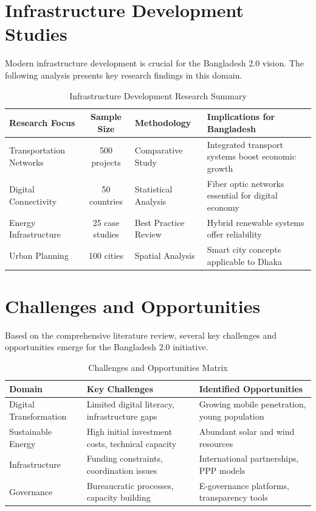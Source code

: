\section{Infrastructure Development Studies}

Modern infrastructure development is crucial for the Bangladesh 2.0 vision. The following analysis presents key research findings in this domain.

\begin{table}[h!]
\centering
\caption{Infrastructure Development Research Summary}
\label{tab:infrastructure}
\begin{tabularx}{\textwidth}{|X|c|X|X|}
\hline
\textbf{Research Focus} & \textbf{Sample Size} & \textbf{Methodology} & \textbf{Implications for Bangladesh} \\
\hline
Transportation Networks & 500 projects & Comparative Study & Integrated transport systems boost economic growth \\
\hline
Digital Connectivity & 50 countries & Statistical Analysis & Fiber optic networks essential for digital economy \\
\hline
Energy Infrastructure & 25 case studies & Best Practice Review & Hybrid renewable systems offer reliability \\
\hline
Urban Planning & 100 cities & Spatial Analysis & Smart city concepts applicable to Dhaka \\
\hline
\end{tabularx}
\end{table}

\section{Challenges and Opportunities}

Based on the comprehensive literature review, several key challenges and opportunities emerge for the Bangladesh 2.0 initiative.

\begin{table}[h!]
\centering
\caption{Challenges and Opportunities Matrix}
\label{tab:challenges_opportunities}
\begin{tabular}{lp{5cm}p{5cm}}
\toprule
\textbf{Domain} & \textbf{Key Challenges} & \textbf{Identified Opportunities} \\
\midrule
Digital Transformation & Limited digital literacy, infrastructure gaps & Growing mobile penetration, young population \\
Sustainable Energy & High initial investment costs, technical capacity & Abundant solar and wind resources \\
Infrastructure & Funding constraints, coordination issues & International partnerships, PPP models \\
Governance & Bureaucratic processes, capacity building & E-governance platforms, transparency tools \\
\bottomrule
\end{tabular}
\end{table}

